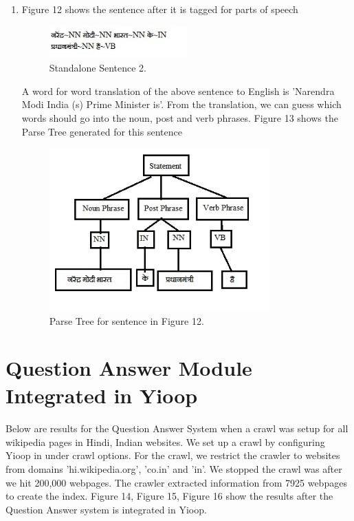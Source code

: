 \begin{enumerate}
\break
\item  Figure 12 shows the sentence after it is tagged for parts of speech

\begin{figure}[htb]
\centering
\includegraphics[width=0.5\textwidth]{images/sentence_testcase2.jpg}
\caption{Standalone Sentence 2.} 
\label{fig:sentence_testcase2}
\end{figure}

A word for word translation of the above sentence to English is 'Narendra Modi India (s) Prime Minister is'. From the translation, we can guess which words should go into the noun, post and verb phrases. Figure 13 shows the Parse Tree generated for this sentence 

\begin{figure}[htb]
\centering
\includegraphics[width=0.8\textwidth]{images/standalone_testcase2.jpg}
\caption{Parse Tree for sentence in Figure 12.} 
\label{fig:standalone_testcase2}
\end{figure}

\end{enumerate}

\break
\section{Question Answer Module Integrated in Yioop}
\paragraph{}
Below are results for the Question Answer System when a crawl was setup for all wikipedia pages in Hindi, Indian websites. We set up a crawl by configuring Yioop in under crawl options. For the crawl, we restrict the crawler to websites from domains 'hi.wikipedia.org', 'co.in' and 'in'. We stopped the crawl was after we hit 200,000 webpages. The crawler extracted information from 7925 webpages to create the index. Figure 14, Figure 15, Figure 16 show the results after the Question Answer system is integrated in Yioop. 

